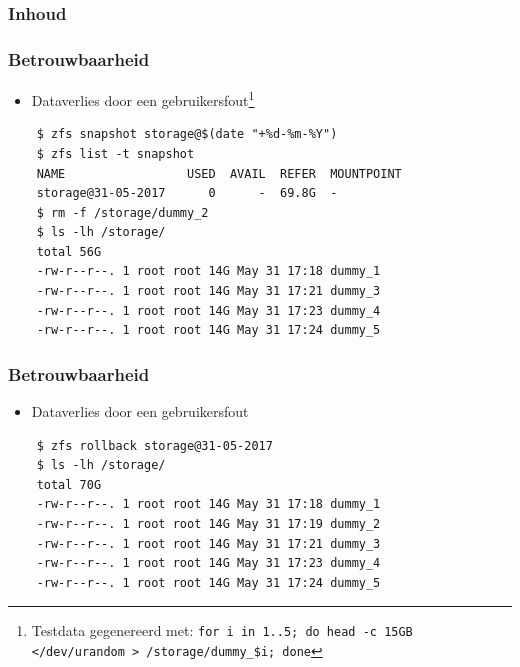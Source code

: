 \documentclass{beamer}
\begin{document}

\begin{frame}
  \frametitle{Inhoud}
  \tableofcontents
\end{frame}


\begin{frame}[fragile]
  \frametitle{Betrouwbaarheid}
  \begin{itemize}
    \item Dataverlies door een gebruikersfout\footnote{Testdata gegenereerd met: \texttt{for i in {1..5}; do head -c 15GB </dev/urandom > /storage/dummy\_\$i; done}}
  \end{itemize}

  \begin{verbatim}
    $ zfs snapshot storage@$(date "+%d-%m-%Y")
    $ zfs list -t snapshot
    NAME                 USED  AVAIL  REFER  MOUNTPOINT
    storage@31-05-2017      0      -  69.8G  -
    $ rm -f /storage/dummy_2
    $ ls -lh /storage/
    total 56G
    -rw-r--r--. 1 root root 14G May 31 17:18 dummy_1
    -rw-r--r--. 1 root root 14G May 31 17:21 dummy_3
    -rw-r--r--. 1 root root 14G May 31 17:23 dummy_4
    -rw-r--r--. 1 root root 14G May 31 17:24 dummy_5
  \end{verbatim}
\end{frame}


\begin{frame}[fragile]
  \frametitle{Betrouwbaarheid}
  \begin{itemize}
    \item Dataverlies door een gebruikersfout  
  \end{itemize}

  \begin{verbatim}
    $ zfs rollback storage@31-05-2017
    $ ls -lh /storage/
    total 70G
    -rw-r--r--. 1 root root 14G May 31 17:18 dummy_1
    -rw-r--r--. 1 root root 14G May 31 17:19 dummy_2
    -rw-r--r--. 1 root root 14G May 31 17:21 dummy_3
    -rw-r--r--. 1 root root 14G May 31 17:23 dummy_4
    -rw-r--r--. 1 root root 14G May 31 17:24 dummy_5
  \end{verbatim}
\end{frame}
\end{document}
